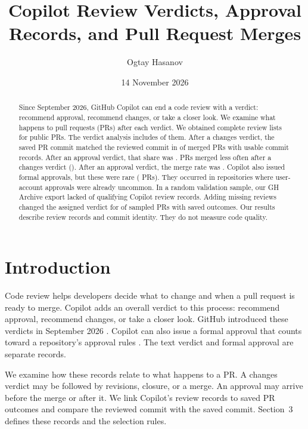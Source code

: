 \documentclass[11pt,letterpaper]{article}
\title{Copilot Review Verdicts, Approval Records, and Pull Request Merges}
\author{Ogtay Hasanov}
\date{14 November 2026}
\begin{document}
\maketitle

\begin{abstract}
Since September 2026, GitHub Copilot can end a code review with a verdict:
recommend approval, recommend changes, or take a closer look. We examine
what happens to pull requests (PRs) after each verdict. We obtained
complete review lists for \CompleteLists{} public PRs. The verdict
analysis includes \OutcomePRs{} of them. After a changes verdict, the saved PR commit matched the reviewed
commit in \ChangesMatchRate{} of merged PRs with usable commit records.
After an approval verdict, that share was \ReadyMatchRate{}. PRs merged less
often after a changes verdict (\ChangesMergeRate{}). After an approval
verdict, the merge rate was \ReadyMergeRate{}. Copilot also issued
formal approvals, but these were rare (\FormalPRs{} PRs). They occurred
in repositories where user-account approvals were already uncommon.
In a random validation sample, our GH Archive export lacked
\AuditMissingReviewRate{} of qualifying Copilot review records. Adding
missing reviews changed the assigned verdict for \AuditGroupChangeRate{}
of sampled PRs with saved outcomes. Our results describe review records
and commit identity. They do not measure code quality.

\end{abstract}

\section{Introduction}

Code review helps developers decide what to change and when a pull
request is ready to merge. Copilot adds an overall verdict to this
process: recommend approval, recommend changes, or take a closer look.
GitHub introduced these verdicts in September 2026
\cite{github_assessments}. Copilot can also issue a formal approval that
counts toward a repository's approval rules \cite{github_approvals}.
The text verdict and formal approval are separate records.

We examine how these records relate to what happens to a PR. A changes
verdict may be followed by revisions, closure, or a merge. An approval
may arrive before the merge or after it. We link Copilot's review
records to saved PR outcomes and compare the reviewed commit with the
saved commit. Section~3 defines these records and the selection rules.
\end{document}
